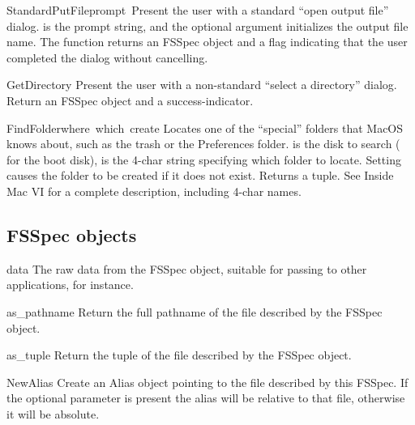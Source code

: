 \begin{funcdesc}{StandardPutFile}{prompt\, }
Present the user with a standard ``open output file''
dialog.  is the prompt string, and the optional
 argument initializes the output file name. The function
returns an FSSpec object and a flag indicating that the user completed
the dialog without cancelling.
\end{funcdesc}

\begin{funcdesc}{GetDirectory}{}
Present the user with a non-standard ``select a directory''
dialog. Return an FSSpec object and a success-indicator.
\end{funcdesc}

\begin{funcdesc}{FindFolder}{where\, which\, create}
Locates one of the ``special'' folders that MacOS knows about, such as
the trash or the Preferences folder.  is the disk to search
( for the boot disk),  is the 4-char string
specifying which folder to locate. Setting  causes the
folder to be created if it does not exist. Returns a  tuple. See Inside Mac VI for a complete description, including
4-char names.
\end{funcdesc}

\subsection{FSSpec objects}

\renewcommand{\indexsubitem}{(FSSpec object attribute)}
\begin{datadesc}{data}
The raw data from the FSSpec object, suitable for passing
to other applications, for instance.
\end{datadesc}

\renewcommand{\indexsubitem}{(FSSpec object method)}
\begin{funcdesc}{as_pathname}{}
Return the full pathname of the file described by the FSSpec object.
\end{funcdesc}

\begin{funcdesc}{as_tuple}{}
Return the  tuple of the file described
by the FSSpec object.
\end{funcdesc}

\begin{funcdesc}{NewAlias}{}
Create an Alias object pointing to the file described by this
FSSpec. If the optional  parameter is present the alias
will be relative to that file, otherwise it will be absolute.
\end{funcdesc}

